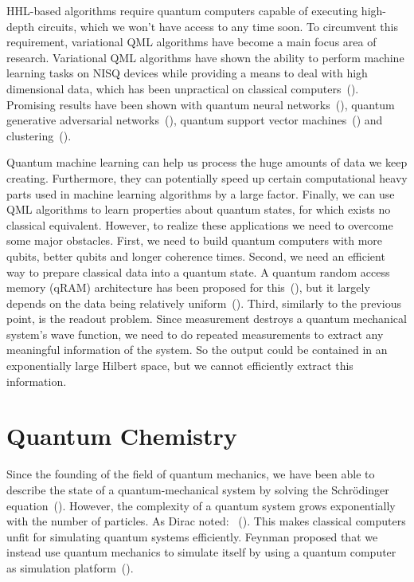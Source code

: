 \documentclass[a4paper,10pt]{article}
\begin{document}
HHL-based algorithms require quantum computers capable of executing high-depth circuits, which we won't have access to any time soon.
To circumvent this requirement, variational QML algorithms have become a main focus area of research.
Variational QML algorithms have shown the ability to perform machine learning tasks on NISQ devices while providing a means to deal with high dimensional data, which has been unpractical on classical computers~(\cite{mitarai2018quantum}).
Promising results have been shown with quantum neural networks~(\cite{qnn-near-term, schuld2018circuit, fanizza2019optimal}), quantum generative adversarial networks~(\cite{romero2019variational, benedetti2019adversarial}), quantum support vector machines~(\cite{havlivcek2019supervised, schuld2019quantum, ghobadi2019power}) and clustering~(\cite{otterbach2017unsupervised}).

Quantum machine learning can help us process the huge amounts of data we keep creating.
Furthermore, they can potentially speed up certain computational heavy parts used in machine learning algorithms by a large factor.
Finally, we can use QML algorithms to learn properties about quantum states, for which exists no classical equivalent.
However, to realize these applications we need to overcome some major obstacles.
First, we need to build quantum computers with more qubits, better qubits and longer coherence times.
Second, we need an efficient way to prepare classical data into a quantum state.
A quantum random access memory (qRAM) architecture has been proposed for this~(\cite{qram}), but it largely depends on the data being relatively uniform~(\cite{aaronson2015read}).
Third, similarly to the previous point, is the readout problem.
Since measurement destroys a quantum mechanical system's wave function, we need to do repeated measurements to extract any meaningful information of the system.
So the output could be contained in an exponentially large Hilbert space, but we cannot efficiently extract this information.

\section{Quantum Chemistry} \label{sec:quantum-chemistry}
Since the founding of the field of quantum mechanics, we have been able to describe the state of a quantum-mechanical system by solving the Schr{\"o}dinger equation~(\cite{griffiths2018introduction}).
However, the complexity of a quantum system grows exponentially with the number of particles.
As Dirac noted: ~(\cite{dirac1929quantum}).
This makes classical computers unfit for simulating quantum systems efficiently.
Feynman proposed that we instead use quantum mechanics to simulate itself by using a quantum computer as simulation platform~(\cite{feynman-simulating}).
\end{document}
